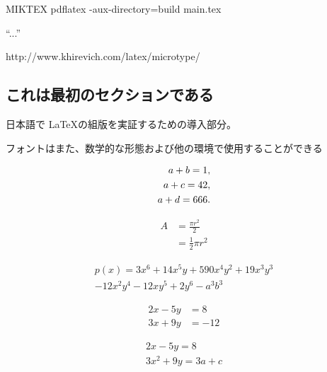 
MIKTEX
pdflatex -aux-directory=build main.tex


``...''


http://www.khirevich.com/latex/microtype/



\usepackage{CJKutf8}

\begin{CJK}{UTF8}{min}
\section{これは最初のセクションである}
日本語で \LaTeX の組版を実証するための導入部分。

フォントはまた、数学的な形態および他の環境で使用することができる
\end{CJK}

\begin{align}
a + b = 1, \notag \\
a + c = 42, \notag \\
a + d = 666. \label{all}
\end{align}

\begin{equation} \label{eq1}
\begin{split}
A & = \frac{\pi r^2}{2} \\
 & = \frac{1}{2} \pi r^2
\end{split}
\end{equation}

\begin{multline*}
p(x) = 3x^6 + 14x^5y + 590x^4y^2 + 19x^3y^3\\
- 12x^2y^4 - 12xy^5 + 2y^6 - a^3b^3
\end{multline*}

\begin{align*}
2x - 5y &=  8 \\
3x + 9y &=  -12
\end{align*}

\begin{gather*}
2x - 5y =  8 \\
3x^2 + 9y =  3a + c
\end{gather*}

